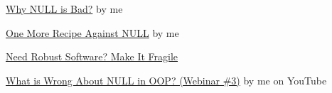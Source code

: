 \documentclass{article}
\begin{document}




\href{https://www.yegor256.com/2014/05/13/why-null-is-bad.html}{Why NULL is Bad?} by me

\href{https://www.yegor256.com/2018/05/22/default-arguments-against-null.html}{One More Recipe Against NULL} by me

\href{https://www.yegor256.com/2015/08/25/fail-fast.html}{Need Robust Software? Make It Fragile}

\href{https://www.youtube.com/watch?v=o3aNJX7AP3M}{What is Wrong About NULL in OOP? (Webinar \#3)} by me on YouTube
\end{document}
